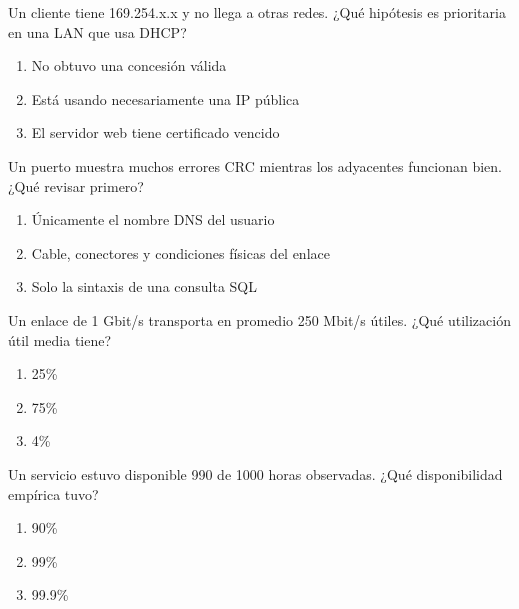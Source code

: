 \noindent\begin{minipage}{\linewidth}\setlength{\parskip}{4pt}\label{q:R-040}
Un cliente tiene 169.254.x.x y no llega a otras redes. ¿Qué hipótesis es prioritaria en una LAN que usa DHCP?
\begin{enumerate}[label=\Alph*),nosep]
\item No obtuvo una concesión válida
\item Está usando necesariamente una IP pública
\item El servidor web tiene certificado vencido
\end{enumerate}\end{minipage}\par\medskip

\noindent\begin{minipage}{\linewidth}\setlength{\parskip}{4pt}\label{q:R-041}
Un puerto muestra muchos errores CRC mientras los adyacentes funcionan bien. ¿Qué revisar primero?
\begin{enumerate}[label=\Alph*),nosep]
\item Únicamente el nombre DNS del usuario
\item Cable, conectores y condiciones físicas del enlace
\item Solo la sintaxis de una consulta SQL
\end{enumerate}\end{minipage}\par\medskip

\noindent\begin{minipage}{\linewidth}\setlength{\parskip}{4pt}\label{q:R-042}
Un enlace de 1 Gbit/s transporta en promedio 250 Mbit/s útiles. ¿Qué utilización útil media tiene?
\begin{enumerate}[label=\Alph*),nosep]
\item 25\%
\item 75\%
\item 4\%
\end{enumerate}\end{minipage}\par\medskip

\noindent\begin{minipage}{\linewidth}\setlength{\parskip}{4pt}\label{q:R-043}
Un servicio estuvo disponible 990 de 1000 horas observadas. ¿Qué disponibilidad empírica tuvo?
\begin{enumerate}[label=\Alph*),nosep]
\item 90\%
\item 99\%
\item 99.9\%
\end{enumerate}\end{minipage}\par\medskip

